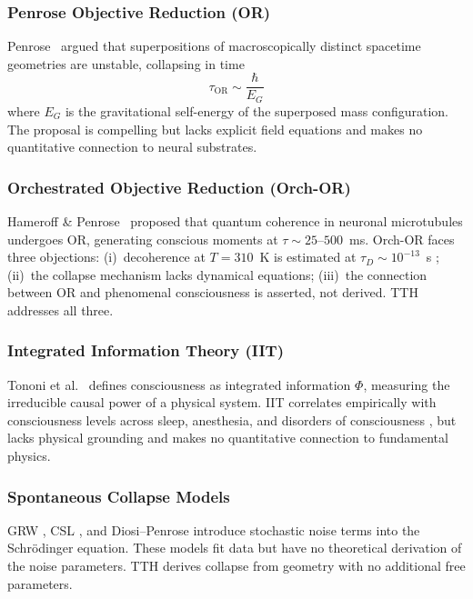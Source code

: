 \documentclass[12pt,a4paper]{article}
\numberwithin{equation}{section}
\begin{document}
\subsubsection{Penrose Objective Reduction (OR)}
Penrose~\citep{Penrose1996} argued that superpositions of macroscopically distinct
spacetime geometries are unstable, collapsing in time
\begin{equation}
  \tau_{\mathrm{OR}} \sim \frac{\hbar}{E_G}
  \label{eq:penrose_tau}
\end{equation}
where $E_G$ is the gravitational self-energy of the superposed mass configuration.
The proposal is compelling but lacks explicit field equations and makes no
quantitative connection to neural substrates.

\subsubsection{Orchestrated Objective Reduction (Orch-OR)}
Hameroff \& Penrose~\citep{Hameroff2014} proposed that quantum coherence in neuronal microtubules
undergoes OR, generating conscious moments at $\tau \sim 25$--$500$~ms.
Orch-OR faces three objections:
(i)~decoherence at $T = 310$~K is estimated at $\tau_D \sim 10^{-13}$~s
\citep{Tegmark2000};
(ii)~the collapse mechanism lacks dynamical equations;
(iii)~the connection between OR and phenomenal consciousness is asserted, not derived.
TTH addresses all three.

\subsubsection{Integrated Information Theory (IIT)}
Tononi et al.~\citep{Tononi2016} defines consciousness as integrated information $\Phi$,
measuring the irreducible causal power of a physical system.
IIT correlates empirically with consciousness levels across sleep, anesthesia,
and disorders of consciousness \citep{Casarotto2016}, but lacks physical
grounding \citep{Aaronson2014} and makes no quantitative connection to
fundamental physics.

\subsubsection{Spontaneous Collapse Models}
GRW \citep{GRW1986}, CSL \citep{Pearle1989}, and Diosi--Penrose \citep{Diosi1987}
introduce stochastic noise terms into the Schr\"odinger equation.
These models fit data but have no theoretical derivation of the noise parameters.
TTH derives collapse from geometry with no additional free parameters.
\end{document}
